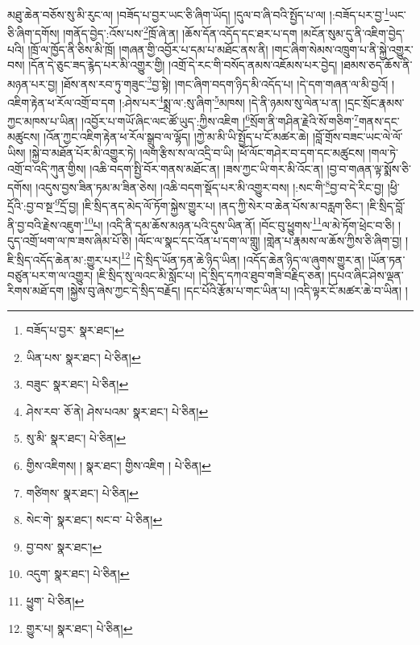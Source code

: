 མཐུ་ཆེན་བཅོས་སུ་མི་རུང་ལ། །བཟོད་པ་བྱར་ཡང་ཅི་ཞིག་ཡོད། །དུལ་བ་ཞི་བའི་སྤྱོད་པ་ལ། །:བཟོད་པར་བྱ་\footnote{བཟོད་པ་བྱར་  སྣར་ཐང་། }ཡང་ཅི་ཞིག་དགོས། །གནོད་བྱེད་:འོས་པས་\footnote{ཡིན་པས་  སྣར་ཐང་།  པེ་ཅིན། }ཁྲོ་ཞེ་ན། །ཆོས་དོན་འདོད་དང་ཐར་པ་དག །མངོན་སུམ་དུ་ནི་འཇིག་བྱེད་པའི། །ཁྲོ་ལ་ཁྱོད་ནི་ཅིས་མི་ཁྲོ། །གཞན་གྱི་འབྱོར་པ་དམ་པ་མཐོང་ནས་ནི། །གང་ཞིག་སེམས་འཁྲུག་པ་ནི་སྐྱེ་འགྱུར་བས། །དོན་དེ་ཅུང་ཟད་རྙེད་པར་མི་འགྱུར་གྱི། །འགྲོ་དེ་རང་གི་བསོད་ནམས་འཇོམས་པར་བྱེད། །ཐམས་ཅད་ཆོས་ནི་མཉན་པར་བྱ། །ཐོས་ནས་རབ་ཏུ་གཟུང་\footnote{བཟུང་  སྣར་ཐང་།  པེ་ཅིན། }བྱ་སྟེ། །གང་ཞིག་བདག་ཉིད་མི་འདོད་པ། །དེ་དག་གཞན་ལ་མི་བྱའོ། །འཇིག་རྟེན་ཕ་རོལ་འགྲོ་བ་དག །:ཤེས་པར་\footnote{ཤེས་རབ་  ཅོ་ནེ། ཤེས་པའམ་  སྣར་ཐང་།  པེ་ཅིན། }སྨྲ་ལ་:སུ་ཞིག་\footnote{སུ་མི་  སྣར་ཐང་།  པེ་ཅིན། }མཁས། །དེ་ནི་ཉམས་སུ་ལེན་པ་ན། །དྲང་སྲོང་རྣམས་ཀྱང་མཁས་པ་ཡིན། །འབྱོར་པ་གཡོ་ཞིང་ལང་ཚོ་ཡུད་:ཀྱིས་འཇིག །\footnote{གྱིས་འཇིགས། །  སྣར་ཐང་། གྱིས་འཇིག །  པེ་ཅིན། }སྲོག་ནི་གཤིན་རྗེའི་སོ་གཅིག་\footnote{གཙིགས་  སྣར་ཐང་།  པེ་ཅིན། }གནས་དང་མཚུངས། །འོན་ཀྱང་འཇིག་རྟེན་ཕ་རོལ་སྒྲུབ་ལ་ལྷོད། །ཀྱེ་མ་མི་ཡི་སྤྱོད་པ་ངོ་མཚར་ཆེ། །བློ་གྲོས་བཟང་ཡང་ལེ་ལོ་ཡིས། །སྐྱེ་བ་མཐོན་པོར་མི་འགྱུར་ཏེ། །ལག་རྩིས་ས་ལ་འདྲི་བ་ཡི། །ཕོ་ལོང་གཤེར་བ་དག་དང་མཚུངས། །གལ་ཏེ་འགྲོ་བ་འདི་ཀུན་གྱིས། །འཆི་བདག་སྤྱི་བོར་གནས་མཐོང་ན། །ཟས་ཀྱང་ཡི་གར་མི་འོང་ན། །བྱ་བ་གཞན་ལྟ་སྨོས་ཅི་དགོས། །འདུས་བྱས་ཟིན་ཏམ་མ་ཟིན་ཅེས། །འཆི་བདག་སྡོད་པར་མི་འགྱུར་བས། །:སང་གི་\footnote{སེང་གེ་  སྣར་ཐང་། སང་བ་  པེ་ཅིན། }བྱ་བ་དེ་རིང་བྱ། །ཕྱི་དྲོའི་:བྱ་བ་སྔ་\footnote{བྱ་བས་  སྣར་ཐང་། }དྲོ་བྱ། །ཇི་སྲིད་ནད་མེད་ལོ་ཏོག་སྐྱེས་གྱུར་པ། །ནད་ཀྱི་སེར་བ་ཆེན་པོས་མ་བརླག་ཅིང་། །ཇི་སྲིད་བློ་ནི་བྱ་བའི་རྗེས་འཇུག་\footnote{འདུག་  སྣར་ཐང་།  པེ་ཅིན། }པ། །འདི་ནི་དམ་ཆོས་མཉན་པའི་དུས་ཡིན་ནོ། །བོང་བུ་ཕྱུགས་\footnote{ཕྱུག་  པེ་ཅིན། }ལ་མེ་ཏོག་ཕྲེང་བ་ཅི། །དུད་འགྲོ་ཕག་ལ་ཁ་ཟས་ཞིམ་པོ་ཅི། །ལོང་ལ་སྣང་དང་འོན་པ་དག་ལ་གླུ། །གླེན་པ་རྣམས་ལ་ཆོས་ཀྱིས་ཅི་ཞིག་བྱ། །ཇི་སྲིད་འདོད་ཆེན་མ་:གྱུར་པར།\footnote{གྱུར་པ།  སྣར་ཐང་།  པེ་ཅིན། } །དེ་སྲིད་ཡོན་ཏན་ཆེ་ཉིད་ཡིན། །འདོད་ཆེན་ཉིད་ལ་ཞུགས་གྱུར་ན། །ཡོན་ཏན་བཙུན་པར་ག་ལ་འགྱུར། །ཇི་སྲིད་སུ་ལའང་མི་སློང་པ། །དེ་སྲིད་དཀའ་ཐུབ་གཟི་བརྗིད་ཅན། །དཔའ་ཞིང་ཤེས་ལྡན་རིགས་མཐོ་དག །སྐྱེས་བུ་ཞེས་ཀྱང་དེ་སྲིད་བརྗོད། །དང་པོའི་རྩོམ་པ་གང་ཡིན་པ། །འདི་ལྟར་ངོ་མཚར་ཆེ་བ་ཡིན། །
